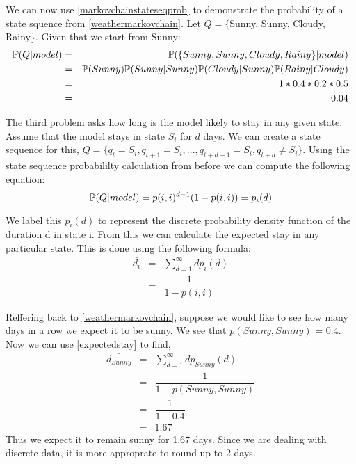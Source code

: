 \begin{example}
	We can now use \ref{markovchainstateseqprob} to demonstrate the probability of a state squence from \ref{weathermarkovchain}. Let $Q = \{$Sunny, Sunny, Cloudy, Rainy\}. Given that we start from Sunny: 
	\begin{eqnarray}
		\mathbb{P} (Q | model) & = & \mathbb{P} (\{Sunny, Sunny, Cloudy, Rainy\} | model) \\
						  & = & \mathbb{P} (Sunny) \mathbb{P} (Sunny| Sunny) \mathbb{P} (Cloudy| Sunny) \mathbb{P} (Rainy| Cloudy)\\
						  & = & 1 * 0.4 * 0.2 * 0.5 \\
						  & = & 0.04 
	\end{eqnarray}
\end{example}

The third problem asks how long is the model likely to stay in any given state. Assume that the model stays in state $S_i$ for $d$ days. We can create a state sequence for this, $Q = \{q_t = S_i ,q_{t+1} = S_i, ..., q_{t+d-1} = S_i, q_{t+d} \neq S_i\}$.  Using the state sequence probabililty calculation from before we can compute the following equation:
\begin{equation}
	\mathbb{P} (Q | model) = p(i,i)^{d-1} (1 - p(i,i)) = p_i(d)
\end{equation}

We label this $p_i(d)$ to represent the discrete probability density function of the duration d in state i. From this we can calculate the expected stay in any particular state. This is done using the following formula:
\begin{eqnarray}
	\label{expectedstay}
	\bar{d_i} & = & \sum_{d=1}^{\infty} d  p_i(d) \\
			  & = & \dfrac{1}{1 - p(i,i)}
\end{eqnarray} 

\begin{example}
	Reffering back to \ref{weathermarkovchain}, suppose we would like to see how many days in a row we expect it to be sunny. We see that $p(Sunny,Sunny)$ = 0.4. Now we can use \ref{expectedstay} to find, 
	\begin{eqnarray}
		\bar{d_{Sunny}} & = & \sum_{d=1}^{\infty} d  p_{Sunny}(d) \\
			  & = & \dfrac{1}{1 - p(Sunny, Sunny)} \\
			  & = & \dfrac{1}{1 - 0.4} \\
			  & = & 1.67
	\end{eqnarray}
	Thus we expect it to remain sunny for 1.67 days. Since we are dealing with discrete data, it is more approprate to round up to 2 days. 
\end{example}

